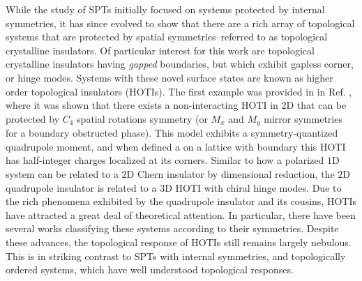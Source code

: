 \documentclass[prb,aps,twocolumn,groupaddress,floatfix]{revtex4-1}
\begin{document}
While the study of SPTs initially focused on systems protected by internal symmetries, it has since evolved to show that there are a rich array of topological systems that are protected by spatial symmetries--referred to as topological crystalline insulators\cite{fu2011, hughes2011, hsieh2012, isobe2015, cheng2016, bradlyn2017}. Of particular interest for this work are topological crystalline insulators having \emph{gapped} boundaries, but which exhibit gapless corner, or hinge modes. Systems with these novel surface states are known as higher order topological insulators (HOTIs)\cite{benalcazar2017a, benalcazar2017b, langbehn2017, song2017, serra2018, peterson2018, imhof2018}. The first example was provided in in Ref. , where it was shown that there exists a non-interacting HOTI in $2$D that can be protected by $C_4$ spatial rotations symmetry (or $M_x$ and $M_y$ mirror symmetries for a boundary obstructed phase\cite{benalcazar2017a,khalaf2019boundary}). This model exhibits a symmetry-quantized quadrupole moment, and when defined a on a lattice with boundary this HOTI has half-integer charges localized at its corners. Similar to how a polarized $1$D system can be related to a $2$D Chern insulator by dimensional reduction, the $2$D quadrupole insulator is related to a $3$D HOTI with chiral hinge modes\cite{benalcazar2017b}. Due to the rich phenomena exhibited by the quadrupole insulator and its cousins, HOTIs have attracted a great deal of theoretical attention. In particular, there have been several works classifying these systems according to their symmetries\cite{song2017b,song2017c,rasmussen2018,thorngren2018}.
Despite these advances, the topological response of HOTIs still remains largely nebulous. This is in striking contrast to SPTs with internal symmetries, and topologically ordered systems, which have well understood topological responses. 
\end{document}
